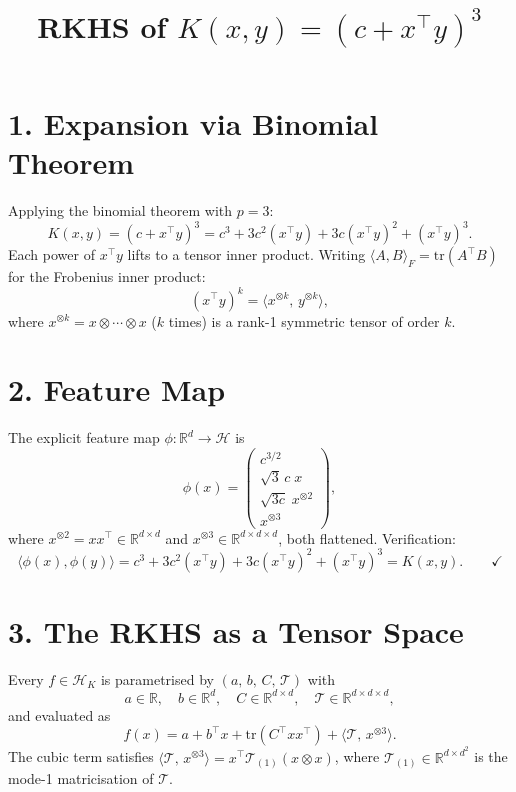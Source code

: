 \documentclass[11pt]{article}
\title{RKHS of $K(x,y) = (c + x^\top y)^{3}$}
\author{}
\date{}
\begin{document}
\maketitle
 
\section*{1. Expansion via Binomial Theorem}
 
Applying the binomial theorem with $p = 3$:
\[
  K(x,y) = (c + x^\top y)^{3}
          = c^{3} + 3c^{2}(x^\top y)
            + 3c(x^\top y)^{2} + (x^\top y)^{3}.
\]
Each power of $x^\top y$ lifts to a tensor inner product.
Writing $\langle A, B \rangle_{F} = \mathrm{tr}(A^\top B)$ for the
Frobenius inner product:
\[
  (x^\top y)^{k} = \langle x^{\otimes k},\, y^{\otimes k} \rangle,
\]
where $x^{\otimes k} = x \otimes \cdots \otimes x$ ($k$ times) is a rank-1
symmetric tensor of order $k$.
 
\section*{2. Feature Map}
 
The explicit feature map $\phi : \mathbb{R}^{d} \to \mathcal{H}$ is
\[
  \phi(x)
  = \begin{pmatrix}
      c^{3/2} \\[4pt]
      \sqrt{3}\,c\; x \\[4pt]
      \sqrt{3c}\; x^{\otimes 2} \\[4pt]
      x^{\otimes 3}
    \end{pmatrix},
\]
where $x^{\otimes 2} = xx^\top \in \mathbb{R}^{d \times d}$ and
$x^{\otimes 3} \in \mathbb{R}^{d \times d \times d}$, both flattened.
Verification:
\[
  \langle \phi(x), \phi(y) \rangle
  = c^{3} + 3c^{2}(x^\top y) + 3c(x^\top y)^{2} + (x^\top y)^{3}
  = K(x,y). \qquad \checkmark
\]
 
\section*{3. The RKHS as a Tensor Space}
 
Every $f \in \mathcal{H}_{K}$ is parametrised by
$(a,\, b,\, C,\, \mathcal{T})$ with
\[
  a \in \mathbb{R},\quad
  b \in \mathbb{R}^{d},\quad
  C \in \mathbb{R}^{d \times d},\quad
  \mathcal{T} \in \mathbb{R}^{d \times d \times d},
\]
and evaluated as
\[
  \boxed{
    f(x) = a + b^\top x
           + \mathrm{tr}(C^\top x x^\top)
           + \langle \mathcal{T},\, x^{\otimes 3} \rangle.
  }
\]
The cubic term satisfies
$\langle \mathcal{T},\, x^{\otimes 3} \rangle
 = x^\top \mathcal{T}_{(1)}(x \otimes x)$,
where $\mathcal{T}_{(1)} \in \mathbb{R}^{d \times d^{2}}$ is the
mode-1 matricisation of $\mathcal{T}$.
 
\end{document}

